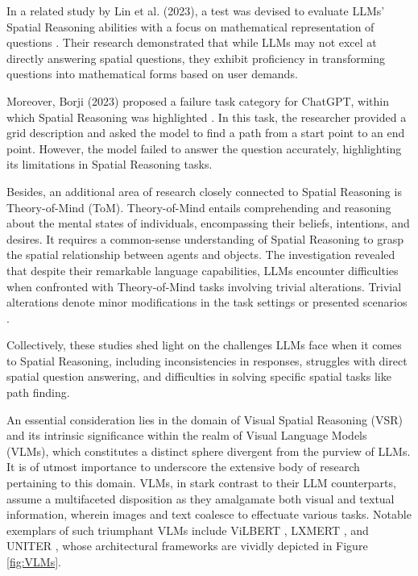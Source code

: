 \documentclass[journal,10pt]{IEEEtran}
\begin{document}
In a related study by Lin et al. (2023), a test was devised to evaluate LLMs' Spatial Reasoning abilities with a focus on mathematical representation of questions \cite{lin2023using}. Their research demonstrated that while LLMs may not excel at directly answering spatial questions, they exhibit proficiency in transforming questions into mathematical forms based on user demands.

Moreover, Borji (2023) proposed a failure task category for ChatGPT, within which Spatial Reasoning was highlighted \cite{borji2023categorical}. In this task, the researcher provided a grid description and asked the model to find a path from a start point to an end point. However, the model failed to answer the question accurately, highlighting its limitations in Spatial Reasoning tasks.

Besides, an additional area of research closely connected to Spatial Reasoning is Theory-of-Mind (ToM). Theory-of-Mind entails comprehending and reasoning about the mental states of individuals, encompassing their beliefs, intentions, and desires. It requires a common-sense understanding of Spatial Reasoning to grasp the spatial relationship between agents and objects. The investigation revealed that despite their remarkable language capabilities, LLMs encounter difficulties when confronted with Theory-of-Mind tasks involving trivial alterations. Trivial alterations denote minor modifications in the task settings or presented scenarios \cite{ullman2023large}.

Collectively, these studies shed light on the challenges LLMs face when it comes to Spatial Reasoning, including inconsistencies in responses, struggles with direct spatial question answering, and difficulties in solving specific spatial tasks like path finding. 

An essential consideration lies in the domain of Visual Spatial Reasoning (VSR) and its intrinsic significance within the realm of Visual Language Models (VLMs), which constitutes a distinct sphere divergent from the purview of LLMs. It is of utmost importance to underscore the extensive body of research pertaining to this domain. VLMs, in stark contrast to their LLM counterparts, assume a multifaceted disposition as they amalgamate both visual and textual information, wherein images and text coalesce to effectuate various tasks. Notable exemplars of such triumphant VLMs include ViLBERT \cite{li2019visualbert}, LXMERT \cite{tan2019lxmert}, and UNITER \cite{chen2020uniter}, whose architectural frameworks are vividly depicted in Figure \ref{fig:VLMs}.
\end{document}
